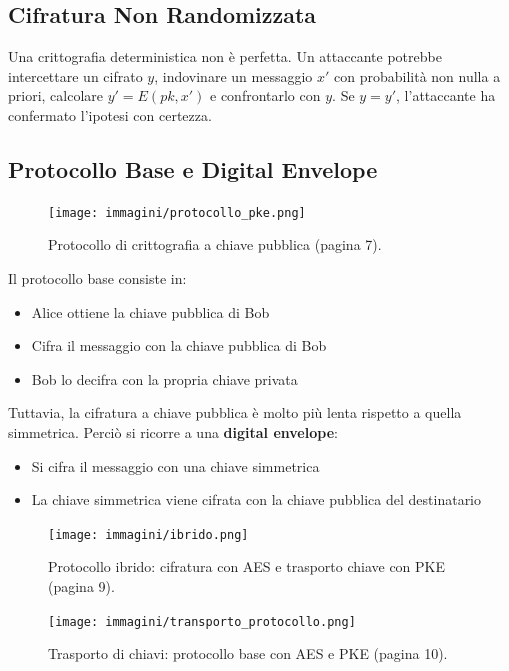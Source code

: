 \documentclass{report}
\begin{document}
\subsection{Cifratura Non Randomizzata}

Una crittografia deterministica non \`e perfetta. Un attaccante potrebbe intercettare un cifrato $y$, indovinare un messaggio $x'$ con probabilit\`a non nulla a priori, calcolare $y' = E(pk, x')$ e confrontarlo con $y$. Se $y = y'$, l'attaccante ha confermato l'ipotesi con certezza.

\subsection{Protocollo Base e Digital Envelope}

\begin{figure}[h]
    \centering
    \texttt{[image: immagini/protocollo\_pke.png]}
    \caption{Protocollo di crittografia a chiave pubblica (pagina 7).}
    \label{fig:base_protocol}
\end{figure}

Il protocollo base consiste in:
\begin{itemize}
  \item Alice ottiene la chiave pubblica di Bob
  \item Cifra il messaggio con la chiave pubblica di Bob
  \item Bob lo decifra con la propria chiave privata
\end{itemize}

Tuttavia, la cifratura a chiave pubblica \`e molto pi\`u lenta rispetto a quella simmetrica. Perci\`o si ricorre a una \textbf{digital envelope}:
\begin{itemize}
  \item Si cifra il messaggio con una chiave simmetrica
  \item La chiave simmetrica viene cifrata con la chiave pubblica del destinatario
\end{itemize}

\begin{figure}[h]
    \centering
    \texttt{[image: immagini/ibrido.png]}
    \caption{Protocollo ibrido: cifratura con AES e trasporto chiave con PKE (pagina 9).}
    \label{fig:hybrid_protocol}
\end{figure}


\begin{figure}[h]
    \centering
    \texttt{[image: immagini/transporto\_protocollo.png]}
    \caption{Trasporto di chiavi: protocollo base con AES e PKE (pagina 10).}
    \label{fig:key_transport}
\end{figure}
\end{document}
